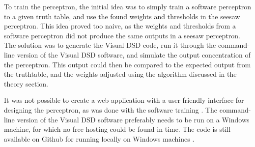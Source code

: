 To train the perceptron, the initial idea was to simply train a software perceptron to a given truth table, and use the found weights and thresholds in the seesaw perceptron. This idea proved too naive, as the weights and thresholds from a software perceptron did not produce the same outputs in a seesaw perceptron. The solution was to generate the Visual DSD code, run it through the command-line version of the Visual DSD software, and simulate the output concentration of the perceptron. This output could then be compared to the expected output from the truthtable, and the weights adjusted using the algorithm discussed in the theory section.

It was not possible to create a web application with a user friendly interface for designing the perceptron, as was done with the software training \cite{neuralcircuit}. The command-line version of the Visual DSD software preferably needs to be run on a Windows machine, for which no free hosting could be found in time. The code is still available on Github for running locally on Windows machines \cite{neuralcompiler}.
